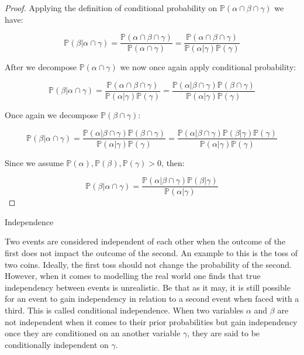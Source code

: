 \documentclass{amsart}
\makeatletter
\def\subsection{\@startsection{subsection}{3}%
  \z@{.5\linespacing\@plus.7\linespacing}{.1\linespacing}%
  {\normalfont\itshape}}
\theoremstyle{plain}
\newcommand{\pr}{\mathbb{P}}
\makeatother
\begin{document}
\begin{proof}
  Applying the definition of conditional probability on $\pr(\alpha\cap\beta\cap\gamma)$ we have:

  \begin{equation*}
    \pr(\beta|\alpha\cap\gamma)=\frac{\pr(\alpha\cap\beta\cap\gamma)}{\pr(\alpha\cap\gamma)}=
    \frac{\pr(\alpha\cap\beta\cap\gamma)}{\pr(\alpha|\gamma)\pr(\gamma)}
  \end{equation*}

  After we decompose $\pr(\alpha\cap\gamma)$ we now once again apply conditional probability:

  \begin{equation*}
    \pr(\beta|\alpha\cap\gamma)=\frac{\pr(\alpha\cap\beta\cap\gamma)}{\pr(\alpha|\gamma)
    \pr(\gamma)}=\frac{\pr(\alpha|\beta\cap\gamma)\pr(\beta\cap\gamma)}{\pr(\alpha|\gamma)
    \pr(\gamma)}
  \end{equation*}

  Once again we decompose $\pr(\beta\cap\gamma)$:

  \begin{equation*}
    \pr(\beta|\alpha\cap\gamma)=\frac{\pr(\alpha|\beta\cap\gamma)\pr(\beta\cap\gamma)}{\pr(\alpha|
    \gamma)\pr(\gamma)}=\frac{\pr(\alpha|\beta\cap\gamma)\pr(\beta|\gamma)\pr(\gamma)}{\pr(\alpha|
    \gamma)\pr(\gamma)}
  \end{equation*}

  Since we assume $\pr(\alpha),\pr(\beta),\pr(\gamma)>0$, then:

  \begin{equation*}
    \pr(\beta|\alpha\cap\gamma)=\frac{\pr(\alpha|\beta\cap\gamma)\pr(\beta|\gamma)}{\pr(\alpha|
    \gamma)}
  \end{equation*}
\end{proof}

\subsection{Independence}

Two events are considered independent of each other when the outcome of the first does not impact
the outcome of the second. An example to this is the toss of two coins. Ideally, the first toss
should not change the probability of the second. However, when it comes to modelling the real world
one finds that true independency between events is unrealistic. Be that as it may, it is still
possible for an event to gain independency in relation to a second event when faced with a third.
This is called conditional independence. When two variables $\alpha$ and $\beta$ are not
independent when it comes to their prior probabilities but gain independency once they are
conditioned on an another variable $\gamma$, they are said to be conditionally independent on
$\gamma$.
\end{document}
